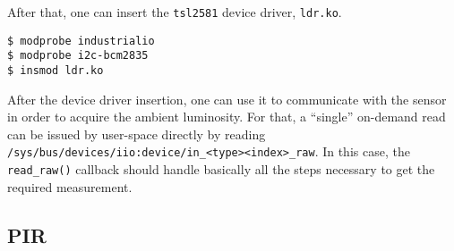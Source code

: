 After that, one can insert the \verb|tsl2581| device driver, \verb|ldr.ko|.

\begin{lstlisting}
$ modprobe industrialio
$ modprobe i2c-bcm2835
$ insmod ldr.ko
\end{lstlisting}

After the device driver insertion, one can use it to communicate with the sensor in order to acquire the ambient luminosity. For that, a “single” on-demand read can be issued by user-space directly by reading \linebreak \verb|/sys/bus/devices/iio:device/in_<type><index>_raw|. In this case, the \verb|read_raw()| callback should handle basically all the steps necessary to get the required measurement. \cite{read_tsl}
\subsection{PIR}